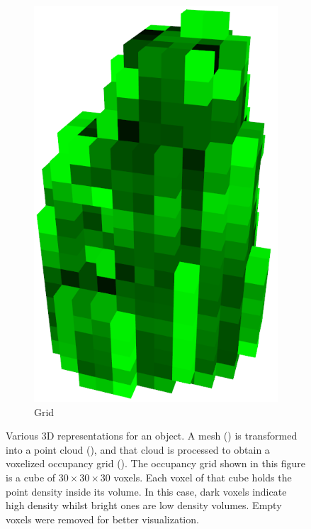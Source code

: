 \begin{figure}[!t]
\begin{subfigure}{0.3\linewidth}
    \includegraphics[width=0.9\linewidth]{Figures/ObjRecog/detergent_grid.png}
    \caption{Grid}
    \label{fig:objrecog:meshcloudgrid:grid}
  \end{subfigure}
  \caption{Various 3D representations for an object. A mesh () is transformed into a point cloud (), and that cloud is processed to obtain a voxelized occupancy grid (). The occupancy grid shown in this figure is a cube of $30\times 30 \times 30$ voxels. Each voxel of that cube holds the point density inside its volume. In this case, dark voxels indicate high density whilst bright ones are low density volumes. Empty voxels were removed for better visualization.}
  \label{fig:objrecog:meshcloudgrid}
\end{figure}

